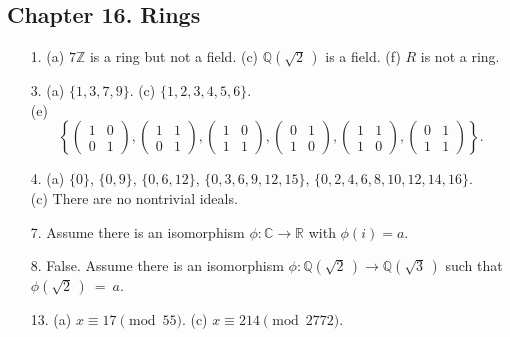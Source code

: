 \subsection*{Chapter 16. Rings}
 
{\small
\begin{itemize}
 
\item[1.]
(a) $7 {\mathbb Z}$ is a ring but not a field.
(c) ${\mathbb Q}(\sqrt{2}\, )$ is a field.
(f) $R$ is not a ring.
 
 
\item[3.]
(a) $\{1, 3, 7, 9 \}$.
(c) $\{ 1, 2, 3, 4, 5, 6 \}$. \\
(e) 
\[
\left\{
\begin{pmatrix}
1 & 0 \\
0 & 1
\end{pmatrix},
\begin{pmatrix}
1 & 1 \\
0 & 1
\end{pmatrix},
\begin{pmatrix}
1 & 0 \\
1 & 1
\end{pmatrix},
\begin{pmatrix}
0 & 1 \\
1 & 0
\end{pmatrix},
\begin{pmatrix}
1 & 1 \\
1 & 0
\end{pmatrix},
\begin{pmatrix}
0 & 1 \\
1 & 1
\end{pmatrix}
\right\}.
\]
 
 
\item[4.]
(a) $\{0 \}$, $\{0, 9 \}$, $\{0, 6, 12 \}$,
 $\{0, 3, 6, 9, 12, 15 \}$,  $\{0, 2, 4, 6, 8, 10, 12, 14, 16 \}$. \\
(c) There are no nontrivial ideals.
 
 
 
\item[7.]
Assume there is an isomorphism $\phi: {\mathbb C} \rightarrow {\mathbb R}$
with $\phi(i) = a$.
 
\item[8.]
False. Assume there is an isomorphism $\phi: {\mathbb Q}(\sqrt{2}\, )
\rightarrow {\mathbb Q}(\sqrt{3}\, )$ such that $\phi(\sqrt{2}\, )~=~a$.
 
\item[13.]
(a) $x \equiv 17 \pmod{55}$. (c) $x \equiv 214 \pmod{2772}$.
 

\end{itemize}}
